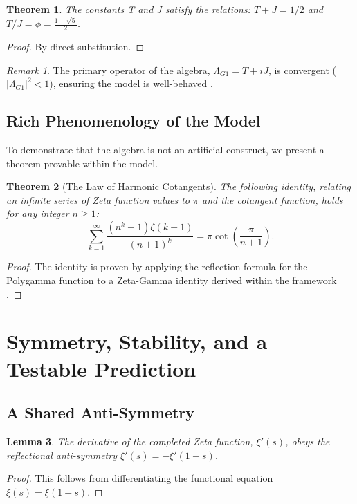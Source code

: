 \documentclass{amsart}
\theoremstyle{plain}
\newtheorem{theorem}{Theorem}
\newtheorem{lemma}[theorem]{Lemma}
\theoremstyle{definition}
\theoremstyle{remark}
\newtheorem*{remark}{Remark}
\begin{document}
\begin{theorem}\label{thm:properties}
The constants T and J satisfy the relations: $T+J = 1/2$ and $T/J = \phi = \frac{1+\sqrt{5}}{2}$.
\end{theorem}
\begin{proof}
By direct substitution.
\end{proof}

\begin{remark}
The primary operator of the algebra, $\Lambda_{G1} = T+iJ$, is convergent ($|\Lambda_{G1}|^2 < 1$), ensuring the model is well-behaved \cite{HarrCompendium}.
\end{remark}

\subsection{Rich Phenomenology of the Model}
To demonstrate that the algebra is not an artificial construct, we present a theorem provable within the model.

\begin{theorem}[The Law of Harmonic Cotangents]\label{thm:cotangents}
The following identity, relating an infinite series of Zeta function values to $\pi$ and the cotangent function, holds for any integer $n \ge 1$:
\[ \sum_{k=1}^{\infty} \frac{(n^k-1)\zeta(k+1)}{(n+1)^k} = \pi \cot\left(\frac{\pi}{n+1}\right). \]
\end{theorem}
\begin{proof}
The identity is proven by applying the reflection formula for the Polygamma function to a Zeta-Gamma identity derived within the framework \cite{HarrCompendium}.
\end{proof}

\section{Symmetry, Stability, and a Testable Prediction}
\subsection{A Shared Anti-Symmetry}
\begin{lemma}\label{lem:symmetry}
The derivative of the completed Zeta function, $\xi'(s)$, obeys the reflectional anti-symmetry $\xi'(s) = -\xi'(1-s)$.
\end{lemma}
\begin{proof}
This follows from differentiating the functional equation $\xi(s) = \xi(1-s)$.
\end{proof}
\end{document}
